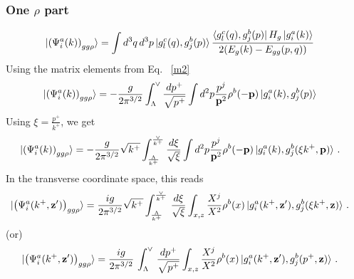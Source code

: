 \documentclass[aps,prd,amsmath,amssymb,nofootinbib]{revtex4-2}
\def\v#1{\mathbf{#1}}
\numberwithin{equation}{section}
\begin{document}
\subsubsection{One $\rho$ part}
\begin{figure}[h]
\end{figure}
\begin{align}
  \ket{ \left(\Psi^{a}_{i}(k) \right)_{gg\rho} }
   & = \int d^{3}q\, d^{3}p 
   \ket{g^{c}_{l}(q),g^{b}_{j}(p)}
 \frac{\bra{g^{c}_{l}(q),g^{b}_{j}(p)}H_{g}\ket{g^{a}_{i}(k)}}{2(E_{g}(k)-E_{gg}(p,q))}
\end{align}
Using the matrix elements from Eq.~ \eqref{m2}
\begin{align}
 \ket{ \left(\Psi^{a}_{i}(k) \right)_{gg\rho} }   & = - \frac{g}{2\pi^{3/2}} \int_{\Lambda}^{\vee} \frac{dp^+}{\sqrt{p^+}}
   \int d^2 p \frac{p^j}{\v{p}^2} \rho^b(-\v{p})
   \ket{g^{a}_{i}(k),g^{b}_{j}(p)}
\end{align}
Using $\xi = \frac{p^{+}}{k^{+}}$, we get
\begin{align}
\ket{ \left(\Psi^{a}_{i}(k) \right)_{gg\rho} }   & = - \frac{g}{2\pi^{3/2}} \sqrt{k^+} \int_{\frac{\Lambda}{k^+} }^{\frac{\vee}{k^+} } \frac{d\xi}{\sqrt{\xi}}
   \int d^2 p \frac{p^j}{\v{p}^2} \rho^b(-\v{p})
   \ket{g^{a}_{i}(k),g^{b}_{j}(\xi k^+,\v{p})}\,.
\end{align}
In the transverse coordinate space, this reads 
\begin{align}
  \notag
  \ket{ \left(\Psi^{a}_{i}(k^+, \v{z}') \right)_{gg\rho} }%
  & = \frac{ig}{2\pi^{3/2}} \sqrt{k^+} \int_{\frac{\Lambda}{k^+} }^{\frac{\vee}{k^+} }\,\frac{d\xi}{\sqrt{\xi}}
   \int_{x,z} \frac{X^j}{X^2} \rho^{b}(x)
   \ket{g^{a}_{i}(k^+,\v{z}'),g^{b}_{j}(\xi k^+,\v{z})}\,.
\end{align}
(or)
\begin{align}%
  \ket{ \left(\Psi^{a}_{i}(k^+, \v{z}') \right)_{gg\rho} }%
  & = \frac{ig}{2\pi^{3/2}}\,\int_{\Lambda}^{\vee}\, \frac{dp^+}{\sqrt{p^+}}
   \int_{x,z} \frac{X^j}{X^2} \rho^{b}(x)
   \ket{g^{a}_{i}(k^+,\v{z}'),g^{b}_{j}(p^+,\v{z})}\,.
\end{align}
\end{document}
